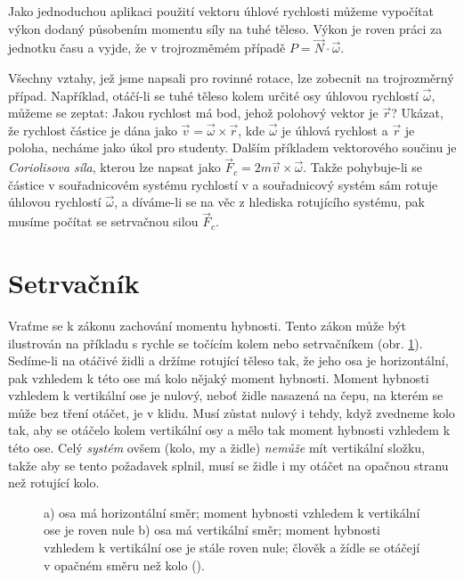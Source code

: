     Jako jednoduchou aplikaci použití vektoru úhlové rychlosti můžeme vypočítat výkon dodaný
    působením momentu síly na tuhé těleso. Výkon je roven práci za jednotku času a vyjde, že v
    trojrozměmém případě \(P=\vec{N}\cdot\vec{\omega}\).

    Všechny vztahy, jež jsme napsali pro rovinné rotace, lze zobecnit na trojrozměrný případ.
    Například, otáčí-li se tuhé těleso kolem určité osy úhlovou rychlostí \(\vec{\omega}\), můžeme
    se zeptat: Jakou rychlost má bod, jehož polohový vektor je \(\vec{r}\)? Ukázat, že rychlost
    částice je dána jako \(\vec{v} = \vec{\omega} \times \vec{r}\), kde \(\vec{\omega}\) je úhlová
    rychlost a \(\vec{r}\) je poloha, necháme jako úkol pro studenty. Dalším příkladem vektorového
    součinu je \emph{Coriolisova síla}, kterou lze napsat jako \(\vec{F}_c =2m\vec{v} \times
    \vec{\omega}\). Takže pohybuje-li se částice v souřadnicovém systému rychlostí v a souřadnicový
    systém sám rotuje úhlovou rychlostí \(\vec{\omega}\), a díváme-li se na věc z hlediska
    rotujícího systému, pak musíme počítat se setrvačnou silou \(\vec{F}_c\).

  \section{Setrvačník}\label{fyz:IchapXXsecIII}
    Vraťme se k zákonu zachování momentu hybnosti. Tento zákon může být ilustrován na příkladu s
    rychle se točícím kolem nebo setrvačníkem (obr. \ref{fyz:fig406}). Sedíme-li na otáčivé židli a
    držíme rotující těleso tak, že jeho osa je horizontální, pak vzhledem k této ose má kolo nějaký
    moment hybnosti. Moment hybnosti vzhledem k vertikální ose je nulový, neboť židle nasazená na
    čepu, na kterém se může bez tření otáčet, je v klidu. Musí zůstat nulový i tehdy, když zvedneme
    kolo tak, aby se otáčelo kolem vertikální osy a mělo tak moment hybnosti vzhledem k této ose.
    Celý \emph{systém} ovšem (kolo, my a židle) \emph{nemůže} mít vertikální složku, takže aby se
    tento požadavek splnil, musí se židle i my otáčet na opačnou stranu než rotující kolo.

    \begin{figure}[ht!] %
      \centering
      \hspace{5em}
      \caption{a) osa má horizontální směr; moment hybnosti vzhledem k vertikální ose je roven nule 
              b) osa má vertikální směr; moment hybnosti vzhledem k vertikální ose je stále roven 
              nule; člověk a žídle se otáčejí v opačném směru než kolo
              (\cite[s.~278]{Feynman01}).}
      \label{fyz:fig406}
    \end{figure}

